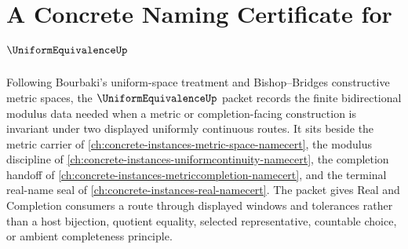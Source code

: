 \chapter{A Concrete Naming Certificate for $\UniformEquivalenceUp$}
\label{ch:concrete-instances-uniform-equivalence-namecert}

Following Bourbaki's uniform-space treatment and Bishop--Bridges constructive metric spaces, the $\UniformEquivalenceUp$ packet records the finite bidirectional modulus data needed when a metric or completion-facing construction is invariant under two displayed uniformly continuous routes. It sits beside the metric carrier of \autoref{ch:concrete-instances-metric-space-namecert}, the modulus discipline of \autoref{ch:concrete-instances-uniformcontinuity-namecert}, the completion handoff of \autoref{ch:concrete-instances-metriccompletion-namecert}, and the terminal real-name seal of \autoref{ch:concrete-instances-real-namecert}. The packet gives Real and Completion consumers a route through displayed windows and tolerances rather than a host bijection, quotient equality, selected representative, countable choice, or ambient completeness principle.

